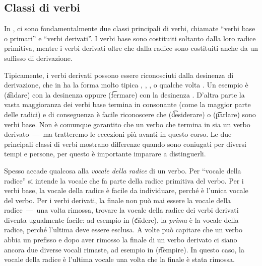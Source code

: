 \subsection{Classi di verbi}
In \quenya, ci sono fondamentalmente due classi principali di verbi,
chiamate ``verbi base o primari'' e ``verbi derivati''. I verbi base sono
costituiti soltanto dalla loro radice primitiva, mentre i verbi derivati oltre
che dalla radice sono costituiti anche da un suffisso di derivazione.

Tipicamente, i verbi derivati possono essere riconosciuti dalla
desinenza di derivazione, che in \quenya ha la forma molto tipica
, , ,  o qualche volta .
Un esempio è  (\t{andare}) con la desinenza  oppure 
(\t{fermare}) con la desinenza .
D'altra parte la vasta maggioranza dei verbi base termina in consonante (come
la maggior parte delle radici) e di conseguenza è facile riconoscere che 
(\t{desiderare}) o  (\t{parlare}) sono verbi base. Non è comunque
garantito che un verbo che termina in  sia un verbo derivato~---~ma
tratteremo le eccezioni più avanti in questo corso.
Le due principali classi di verbi mostrano differenze quando sono coniugati per
diversi tempi e persone, per questo è importante imparare a distinguerli.

Spesso accade qualcosa alla \emph{vocale della radice} di un verbo. Per
``vocale della radice'' si intende la vocale che fa parte della radice primitiva
del verbo. Per i verbi base, la vocale della radice è facile da individuare,
perché è l'unica vocale del verbo. Per i verbi derivati, la  finale non
può mai essere la vocale della radice~---~una volta rimossa, trovare la vocale
della radice dei verbi derivati diventa ugualmente facile: ad esempio in
 (\t{cadere}), la \emph{prima}  è la vocale della radice, perché l'ultima
 deve essere esclusa. A volte può capitare che un verbo abbia un prefisso
e dopo aver rimosso la  finale di un verbo derivato ci siano ancora due
diverse vocali rimaste, ad esempio in  (\t{riempire}). In questo caso, la
vocale della radice è l'ultima vocale una volta che la  finale è stata
rimossa.
